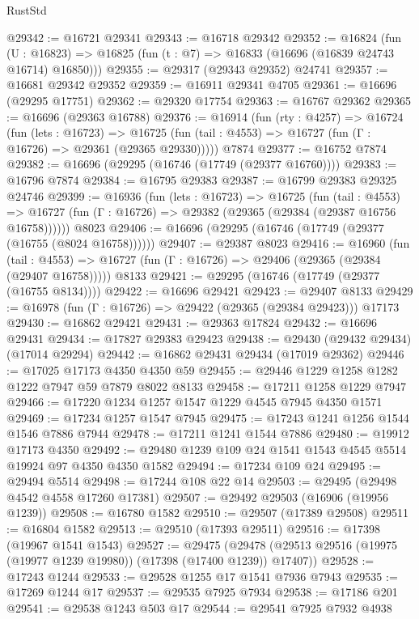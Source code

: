 \begin{lexlean}{RustStd}
\begin{coremodule}
@29342 := @16721 @29341
@29343 := @16718 @29342
@29352 := @16824
    (fun (U : @16823) => @16825 (fun (t : @7) => @16833 (@16696 (@16839 @24743 @16714) @16850)))
@29355 := @29317 (@29343 @29352) @24741
@29357 := @16681 @29342 @29352
@29359 := @16911 @29341 @4705
@29361 := @16696 (@29295 @17751)
@29362 := @29320 @17754
@29363 := @16767 @29362
@29365 := @16696 (@29363 @16788)
@29376 := @16914
    (fun (rty : @4257) =>
    @16724
      (fun (lets : @16723) =>
      @16725 (fun (tail : @4553) => @16727 (fun (Γ : @16726) => @29361 (@29365 @29330)))))
    @7874
@29377 := @16752 @7874
@29382 := @16696 (@29295 (@16746 (@17749 (@29377 @16760))))
@29383 := @16796 @7874
@29384 := @16795 @29383
@29387 := @16799 @29383 @29325 @24746
@29399 := @16936
    (fun (lets : @16723) =>
    @16725
      (fun (tail : @4553) =>
      @16727 (fun (Γ : @16726) => @29382 (@29365 (@29384 (@29387 @16756 @16758))))))
    @8023
@29406 := @16696 (@29295 (@16746 (@17749 (@29377 (@16755 (@8024 @16758))))))
@29407 := @29387 @8023
@29416 := @16960
    (fun (tail : @4553) => @16727 (fun (Γ : @16726) => @29406 (@29365 (@29384 (@29407 @16758)))))
    @8133
@29421 := @29295 (@16746 (@17749 (@29377 (@16755 @8134))))
@29422 := @16696 @29421
@29423 := @29407 @8133
@29429 := @16978 (fun (Γ : @16726) => @29422 (@29365 (@29384 @29423))) @17173
@29430 := @16862 @29421
@29431 := @29363 @17824
@29432 := @16696 @29431
@29434 := @17827 @29383 @29423
@29438 := @29430 (@29432 @29434) (@17014 @29294)
@29442 := @16862 @29431 @29434 (@17019 @29362)
@29446 := @17025 @17173 @4350 @4350 @59
@29455 := @29446 @1229 @1258 @1282 @1222 @7947 @59 @7879 @8022 @8133
@29458 := @17211 @1258 @1229 @7947
@29466 := @17220 @1234 @1257 @1547 @1229 @4545 @7945 @4350 @1571
@29469 := @17234 @1257 @1547 @7945
@29475 := @17243 @1241 @1256 @1544 @1546 @7886 @7944
@29478 := @17211 @1241 @1544 @7886
@29480 := @19912 @17173 @4350
@29492 := @29480 @1239 @109 @24 @1541 @1543 @4545 @5514 @19924 @97 @4350 @4350 @1582
@29494 := @17234 @109 @24
@29495 := @29494 @5514
@29498 := @17244 @108 @22 @14
@29503 := @29495 (@29498 @4542 @4558 @17260 @17381)
@29507 := @29492 @29503 (@16906 (@19956 @1239))
@29508 := @16780 @1582
@29510 := @29507 (@17389 @29508)
@29511 := @16804 @1582
@29513 := @29510 (@17393 @29511)
@29516 := @17398 (@19967 @1541 @1543)
@29527 := @29475
    (@29478 (@29513 @29516 (@19975 (@19977 @1239 @19980)) (@17398 (@17400 @1239)) @17407))
@29528 := @17243 @1244
@29533 := @29528 @1255 @17 @1541 @7936 @7943
@29535 := @17269 @1244 @17
@29537 := @29535 @7925 @7934
@29538 := @17186 @201
@29541 := @29538 @1243 @503 @17
@29544 := @29541 @7925 @7932 @4938

\end{coremodule}
\end{lexlean}
